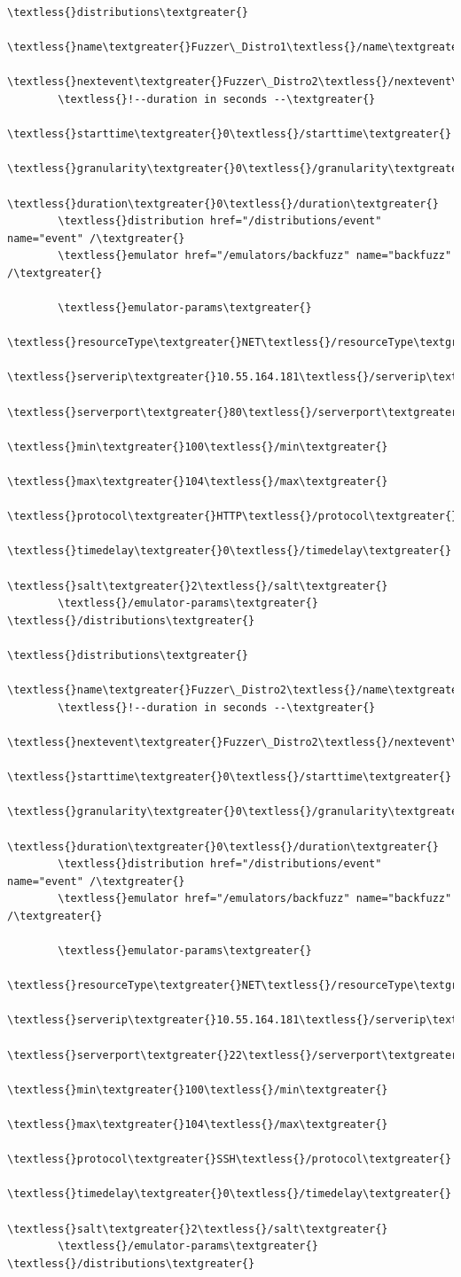 \documentclass[letterpaper,10pt,english]{sphinxhowto}
\begin{document}
\begin{Verbatim}[commandchars=\\\{\}]
\textless{}distributions\textgreater{}
        \textless{}name\textgreater{}Fuzzer\_Distro1\textless{}/name\textgreater{}
        \textless{}nextevent\textgreater{}Fuzzer\_Distro2\textless{}/nextevent\textgreater{}
        \textless{}!--duration in seconds --\textgreater{}
        \textless{}starttime\textgreater{}0\textless{}/starttime\textgreater{}
        \textless{}granularity\textgreater{}0\textless{}/granularity\textgreater{}
        \textless{}duration\textgreater{}0\textless{}/duration\textgreater{}
        \textless{}distribution href="/distributions/event" name="event" /\textgreater{}
        \textless{}emulator href="/emulators/backfuzz" name="backfuzz" /\textgreater{}

        \textless{}emulator-params\textgreater{}
                \textless{}resourceType\textgreater{}NET\textless{}/resourceType\textgreater{}
                \textless{}serverip\textgreater{}10.55.164.181\textless{}/serverip\textgreater{}
                \textless{}serverport\textgreater{}80\textless{}/serverport\textgreater{}
                \textless{}min\textgreater{}100\textless{}/min\textgreater{}
                \textless{}max\textgreater{}104\textless{}/max\textgreater{}
                \textless{}protocol\textgreater{}HTTP\textless{}/protocol\textgreater{}
                \textless{}timedelay\textgreater{}0\textless{}/timedelay\textgreater{}
                \textless{}salt\textgreater{}2\textless{}/salt\textgreater{}
        \textless{}/emulator-params\textgreater{}
\textless{}/distributions\textgreater{}

\textless{}distributions\textgreater{}
        \textless{}name\textgreater{}Fuzzer\_Distro2\textless{}/name\textgreater{}
        \textless{}!--duration in seconds --\textgreater{}
        \textless{}nextevent\textgreater{}Fuzzer\_Distro2\textless{}/nextevent\textgreater{}
        \textless{}starttime\textgreater{}0\textless{}/starttime\textgreater{}
        \textless{}granularity\textgreater{}0\textless{}/granularity\textgreater{}
        \textless{}duration\textgreater{}0\textless{}/duration\textgreater{}
        \textless{}distribution href="/distributions/event" name="event" /\textgreater{}
        \textless{}emulator href="/emulators/backfuzz" name="backfuzz" /\textgreater{}

        \textless{}emulator-params\textgreater{}
                \textless{}resourceType\textgreater{}NET\textless{}/resourceType\textgreater{}
                \textless{}serverip\textgreater{}10.55.164.181\textless{}/serverip\textgreater{}
                \textless{}serverport\textgreater{}22\textless{}/serverport\textgreater{}
                \textless{}min\textgreater{}100\textless{}/min\textgreater{}
                \textless{}max\textgreater{}104\textless{}/max\textgreater{}
                \textless{}protocol\textgreater{}SSH\textless{}/protocol\textgreater{}
                \textless{}timedelay\textgreater{}0\textless{}/timedelay\textgreater{}
                \textless{}salt\textgreater{}2\textless{}/salt\textgreater{}
        \textless{}/emulator-params\textgreater{}
\textless{}/distributions\textgreater{}
\end{Verbatim}
\end{document}

